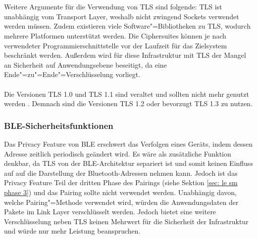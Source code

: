 \\\\
Weitere Argumente für die Verwendung von TLS sind folgende: TLS ist unabhängig vom Transport Layer, weshalb nicht zwingend Sockets verwendet werden müssen. Zudem existieren viele Software"=Bibliotheken zu TLS, wodurch mehrere Platformen unterstützt werden. Die Ciphersuites können je nach verwendeter Programmierschnittstelle vor der Laufzeit für das Zielsystem beschränkt werden. Außerdem wird für diese Infrastruktur mit TLS der Mangel an Sicherheit auf Anwendungsebene beseitigt, da eine Ende"=zu"=Ende"=Verschlüsselung vorliegt. %
\\\\
Die Versionen TLS 1.0 und TLS 1.1 sind veraltet und sollten nicht mehr genutzt werden \cite{RFC8996}. Demnach sind die Versionen TLS 1.2 oder bevorzugt TLS 1.3 zu nutzen.

\subsubsection{BLE-Sicherheitsfunktionen}
\label{sec: infra sicherheit ble funktionen}
Das Privacy Feature von BLE erschwert das Verfolgen eines Geräts, indem dessen Adresse zeitlich periodisch geändert wird. Es wäre als zusätzliche Funktion denkbar, da TLS von der BLE-Architektur separiert ist und somit keinen Einfluss auf auf die Darstellung der Bluetooth-Adressen nehmen kann. Jedoch ist das Privacy Feature Teil der dritten Phase des Pairings (siehe Sektion \ref{sec: le sm phase 3}) und das Pairing sollte nicht verwendet werden. Unabhängig davon, welche Pairing"=Methode verwendet wird, würden die Anwendungsdaten der Pakete im Link Layer verschlüsselt werden. Jedoch bietet eine weitere Verschlüsselung neben TLS keinen Mehrwert für die Sicherheit der Infrastruktur und würde nur mehr Leistung beanspruchen.